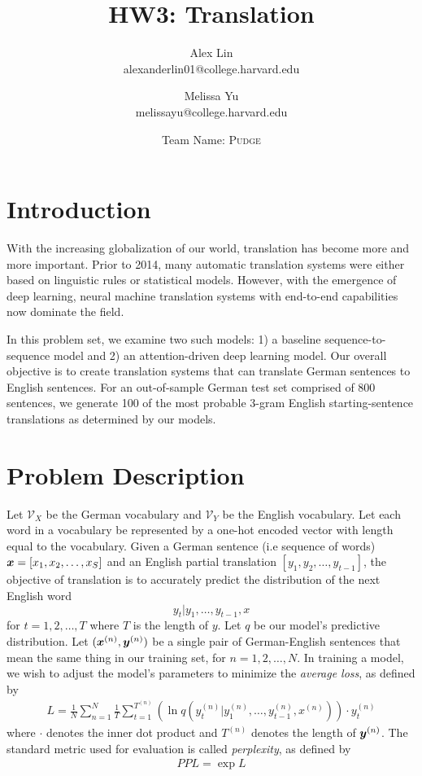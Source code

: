 \documentclass[11pt]{article}
\title{HW3: Translation}
\author{Alex Lin \\ alexanderlin01@college.harvard.edu \and Melissa Yu \\ melissayu@college.harvard.edu \and Team Name: \textsc{Pudge}}
\begin{document}
\maketitle{}
\section{Introduction}

With the increasing globalization of our world, translation has become more and more important.  Prior to 2014, many automatic translation systems were either based on linguistic rules or statistical models.  However, with the emergence of deep learning, neural machine translation systems with end-to-end capabilities now dominate the field.  

In this problem set, we examine two such models: 1) a baseline sequence-to-sequence model and 2) an attention-driven deep learning model.  Our overall objective is to create translation systems that can translate German sentences to English sentences.  For an out-of-sample German test set comprised of 800 sentences, we generate 100 of the most probable 3-gram English starting-sentence translations as determined by our models.         

\section{Problem Description}

Let $\mathcal{V}_X$ be the German vocabulary and $\mathcal{V}_Y$ be the English vocabulary.  Let each word in a vocabulary be represented by a one-hot encoded vector with length equal to the vocabulary.  Given a German sentence (i.e sequence of words) $\boldsymbol{x} = [x_1, x_2, \ldots, x_S]$ and an English partial translation $[y_1, y_2, \ldots, y_{t-1}]$, the objective of translation is to accurately predict the distribution of the next English word $$y_t \vert y_1, \ldots, y_{t-1}, x$$ for $t = 1, 2, \ldots, T$ where $T$ is the length of $y$.  Let $q$ be our model's predictive distribution.  Let $(\boldsymbol{x}^{(n)}, \boldsymbol{y}^{(n)})$ be a single pair of German-English sentences that mean the same thing in our training set, for $n = 1, 2, \ldots, N$.  In training a model, we wish to adjust the model's parameters to minimize the \emph{average loss}, as defined by
\begin{align*}
L = \frac{1}{N} \sum_{n=1}^N \frac{1}{T} \sum_{t=1}^{T^{(n)}} \left(\ln q(y^{(n)}_t \vert y_1^{(n)}, \ldots, y_{t-1}^{(n)}, x^{(n)}) \right) \cdot y^{(n)}_t
\end{align*}
where $\cdot$ denotes the inner dot product and $T^{(n)}$ denotes the length of $\boldsymbol{y}^{(n)}$.  The standard metric used for evaluation is called \emph{perplexity}, as defined by
\begin{align*}
PPL = \exp L
\end{align*}
\end{document}
